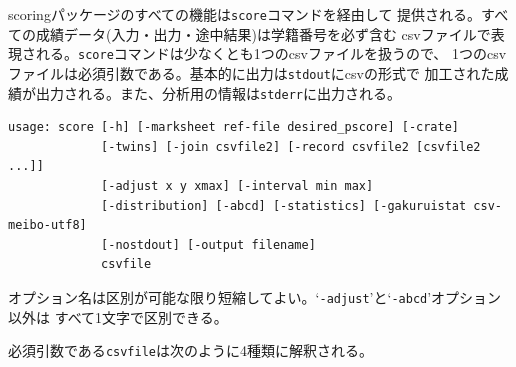 scoringパッケージのすべての機能は\texttt{score}コマンドを経由して
提供される。すべての成績データ(入力・出力・途中結果)は学籍番号を必ず含む
csvファイルで表現される。\texttt{score}コマンドは少なくとも1つのcsvファイルを扱うので、
1つのcsvファイルは必須引数である。基本的に出力は\texttt{stdout}にcsvの形式で
加工された成績が出力される。また、分析用の情報は\texttt{stderr}に出力される。
\begin{tcolorbox}[enhanced jigsaw,breakable,colframe=\mycolor ,colback=white,colbacktitle=\mycolor ,coltitle=white,fonttitle=\bfseries\sffamily,title=\texttt{\$ score -h}]

\begin{verbatim}
usage: score [-h] [-marksheet ref-file desired_pscore] [-crate]
             [-twins] [-join csvfile2] [-record csvfile2 [csvfile2 ...]]
             [-adjust x y xmax] [-interval min max]
             [-distribution] [-abcd] [-statistics] [-gakuruistat csv-meibo-utf8]
             [-nostdout] [-output filename]
             csvfile
\end{verbatim}

\end{tcolorbox}
オプション名は区別が可能な限り短縮してよい。`\texttt{-adjust}'と`\texttt{-abcd}'オプション以外は
すべて1文字で区別できる。

必須引数である\texttt{csvfile}は次のように4種類に解釈される。

